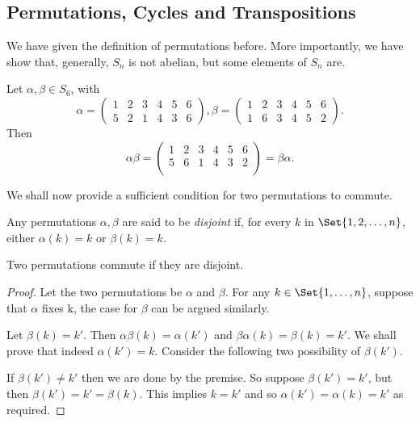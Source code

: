\documentclass[main.tex]{subfiles}
\begin{document}
			\subsection{Permutations, Cycles and Transpositions}
				We have given the definition of permutations before. More importantly, we have show that, generally, $S_n$ is not abelian, but some elements of $S_n$ are.
				\begin{example}
					Let $\alpha, \beta \in S_6$, with
					\begin{equation*}
						\alpha =
						\begin{pmatrix}
							1 & 2 & 3 & 4 & 5 & 6\\
							5 & 2 & 1 & 4 & 3 & 6
						\end{pmatrix},
						\beta =
						\begin{pmatrix}
							1 & 2 & 3 & 4 & 5 & 6\\
							1 & 6 & 3 & 4 & 5 & 2
						\end{pmatrix}.
					\end{equation*}
					Then
					\begin{equation*}
						\alpha\beta = 
						\begin{pmatrix}
							1 & 2 & 3 & 4 & 5 & 6\\
							5 & 6 & 1 & 4 & 3 & 2\\
						\end{pmatrix}
						= \beta\alpha.
					\end{equation*}
				\end{example}
				We shall now provide a sufficient condition for two permutations to commute.
				\begin{definition}
					Any permutations $\alpha, \beta$ are said to be \textit{disjoint} if, for every $k$ in $\Set{1, 2, \ldots, n}$, either $\alpha(k) = k$ or $\beta(k) = k$.
				\end{definition}
				\begin{theorem}
					Two permutations commute if they are disjoint.
				\end{theorem}
				\begin{proof}
					Let the two permutations be $\alpha$ and $\beta$. For any $k \in \Set{1, \ldots, n}$, suppose that $\alpha$ fixes k, the case for $\beta$ can be argued similarly. 
					
					Let $\beta(k) = k'$. Then $\alpha\beta (k) = \alpha(k')$ and $\beta\alpha(k) = \beta(k) = k'$. We shall prove that indeed $\alpha(k') = k$. Consider the following two possibility of $\beta(k')$.
					
					If $\beta(k') \neq k'$ then we are done by the premise. So suppose $\beta(k') = k'$, but then $\beta(k') = k' = \beta(k)$. This implies $k = k'$ and so $\alpha(k') = \alpha(k) = k'$ as required.
				\end{proof}
			
\end{document}
